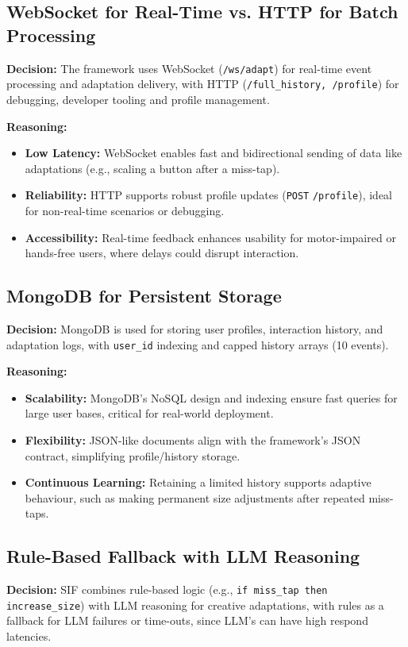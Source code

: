 \subsection{WebSocket for Real-Time vs. HTTP for Batch Processing}
\textbf{Decision:} The framework uses WebSocket (\texttt{/ws/adapt}) for real-time event processing and adaptation delivery, with HTTP (\texttt{/full\_history, /profile}) for debugging, developer tooling and profile management.

\textbf{Reasoning:}
\begin{itemize}
    \item \textbf{Low Latency:} WebSocket enables fast and bidirectional sending of data like adaptations (e.g., scaling a button after a miss-tap).
    \item \textbf{Reliability:} HTTP supports robust profile updates (\texttt{POST} \texttt{/profile}), ideal for non-real-time scenarios or debugging.
    \item \textbf{Accessibility:} Real-time feedback enhances usability for motor-impaired or hands-free users, where delays could disrupt interaction. 
\end{itemize}

\subsection{MongoDB for Persistent Storage}
\textbf{Decision:} MongoDB is used for storing user profiles, interaction history, and adaptation logs, with \texttt{user\_id} indexing and capped history arrays (10 events).

\textbf{Reasoning:}
\begin{itemize}
  \item \textbf{Scalability:} MongoDB’s NoSQL design and indexing ensure fast queries for large user bases, critical for real-world deployment.
  \item \textbf{Flexibility:} JSON-like documents align with the framework’s JSON contract, simplifying profile/history storage.
  \item \textbf{Continuous Learning:} Retaining a limited history supports adaptive behaviour, such as making permanent size adjustments after repeated miss-taps.
\end{itemize}

\subsection{Rule-Based Fallback with LLM Reasoning}
\textbf{Decision:} SIF combines rule-based logic (e.g., \texttt{if miss\_tap then increase\_size}) with LLM reasoning for creative adaptations, with rules as a fallback for LLM failures or time-outs, since LLM's can have high respond latencies.

